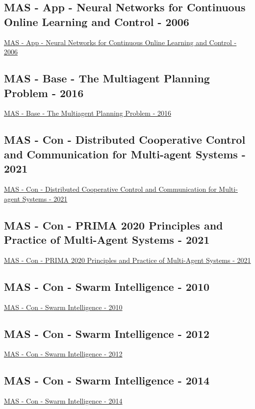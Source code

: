 \subsection{MAS - App - Neural Networks for Continuous Online Learning and Control - 2006}
\href{https://ieeexplore.ieee.org/abstract/document/4012019}{MAS - App - Neural Networks for Continuous Online Learning and Control - 2006}

\subsection{MAS - Base - The Multiagent Planning Problem - 2016}
\href{https://www.hindawi.com/journals/complexity/2017/3813912/}{MAS - Base - The Multiagent Planning Problem - 2016}

\subsection{MAS - Con - Distributed Cooperative Control and Communication for Multi-agent Systems - 2021}
\href{https://link.springer.com/book/10.1007%2F978-981-33-6718-0}{MAS - Con - Distributed Cooperative Control and Communication for Multi-agent Systems - 2021}

\subsection{MAS - Con - PRIMA 2020 Principles and Practice of Multi-Agent Systems - 2021}
\href{https://link.springer.com/book/10.1007%2F978-3-030-69322-0}{MAS - Con - PRIMA 2020 Principles and Practice of Multi-Agent Systems - 2021}

\subsection{MAS - Con - Swarm Intelligence - 2010}
\href{https://link.springer.com/book/10.1007/978-3-642-15461-4}{MAS - Con - Swarm Intelligence - 2010}

\subsection{MAS - Con - Swarm Intelligence - 2012}
\href{https://link.springer.com/book/10.1007/978-3-642-32650-9}{MAS - Con - Swarm Intelligence - 2012}

\subsection{MAS - Con - Swarm Intelligence - 2014}
\href{https://link.springer.com/book/10.1007/978-3-319-09952-1}{MAS - Con - Swarm Intelligence - 2014}

